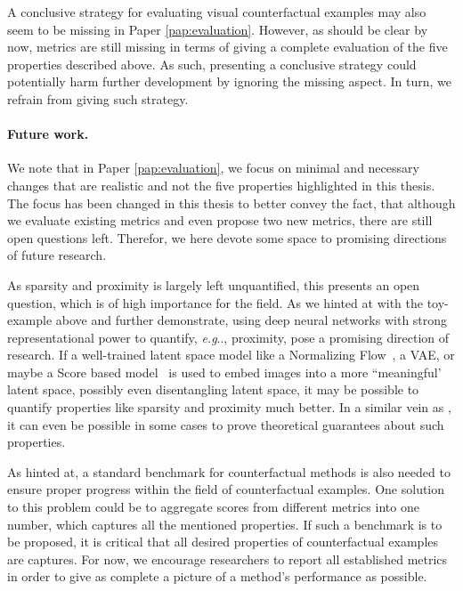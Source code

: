 \documentclass[11pt,a4paper,twoside,openright,final]{memoir}
\makeatletter
\DeclareRobustCommand\onedot{\futurelet\@let@token\@onedot}
\def\@onedot{\ifx\@let@token.\else.\null\fi\xspace}
\def\eg{\emph{e.g}\onedot} \def\Eg{\emph{E.g}\onedot}
\newcommand*{\paperref}[1]{Paper \hyperref[#1]{\ref{#1}}}
\makeatother
\begin{document}
A conclusive strategy for evaluating visual counterfactual examples may also seem to be missing in \paperref{pap:evaluation}. 
However, as should be clear by now, metrics are still missing in terms of giving a complete evaluation of the five properties described above.
As such, presenting a conclusive strategy could potentially harm further development by ignoring the missing aspect. 
In turn, we refrain from giving such strategy. 

\paragraph{Future work.}
We note that in \paperref{pap:evaluation}, we focus on minimal and necessary changes that are realistic and not the five properties highlighted in this thesis.
The focus has been changed in this thesis to better convey the fact, that although we evaluate existing metrics and even propose two new metrics, there are still open questions left. 
Therefor, we here devote some space to promising directions of future research. 

As sparsity and proximity is largely left unquantified, this presents an open question, which is of high importance for the field.
As we hinted at with the toy-example above and \citet{Rodriguez2021} further demonstrate, using deep neural networks with strong representational power to quantify, \eg, proximity, pose a promising direction of research.
If a well-trained latent space model like a Normalizing Flow~\cite{}, a VAE, or maybe a Score based model~\cite{} is used
to embed images into a more ``meaningful' latent space, possibly even disentangling latent space, it may be possible to 
quantify properties like sparsity and proximity much better.
In a similar vein as \cite{flow-cf}, it can even be possible in some cases to prove theoretical guarantees about such properties. 

As hinted at, a standard benchmark for counterfactual methods is also needed to ensure proper progress within the field of counterfactual examples. 
One solution to this problem could be to aggregate scores from different metrics into one number, which captures all the mentioned properties.
If such a benchmark is to be proposed, it is critical that all desired properties of counterfactual examples are captures.
For now, we encourage researchers to report all established metrics in order to give as complete a picture of a method's performance as possible.

%
    
\end{document}
